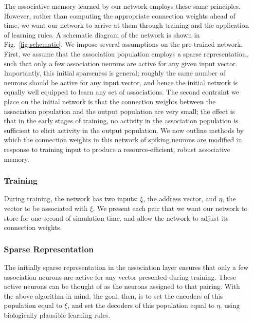 \documentclass[10pt,letterpaper]{article}
\newcommand{\fg}{Fig.}
\begin{document}
The associative memory learned by our network employs these same principles. However, rather than computing the appropriate connection weights ahead of time, we want our network to arrive at them through training and the application of learning rules. A schematic diagram of the network is shown in \fg~\ref{fig:schematic}. We impose several assumptions on the pre-trained network. 
First, we assume that the association population employs a sparse representation, such that only a few association neurons are active for any given input vector. Importantly, this initial sparseness is general; roughly the same number of neurons should be active for any input vector, and hence the initial network is equally well equipped to learn any set of associations. The second contraint we place on the initial network is that the connection weights between the association population and the output population are very small; the effect is that in the early stages of training, no activity in the association population is sufficient to elicit activity in the output population. We now outline methods by which the connection weights in this network of spiking neurons are modified in response to training input to produce a resource-efficient, robust associative memory.

\subsubsection{Training}
During training, the network has two inputs: $\xi$, the address vector, and $\eta$, the vector to be associated with $\xi$. We present each pair that we want our network to store for one second of simulation time, and allow the network to adjust its connection weights.

\subsubsection{Sparse Representation}
The initially sparse representation in the association layer ensures that only a few association neurons are active for any vector presented during training. These active neurons can be thought of as the neurons assigned to that pairing. With the above algorithm in mind, the goal, then, is to set the encoders of this population equal to $\xi$, and set the decoders of this population equal to $\eta$, using biologically plausible learning rules. 
\end{document}
